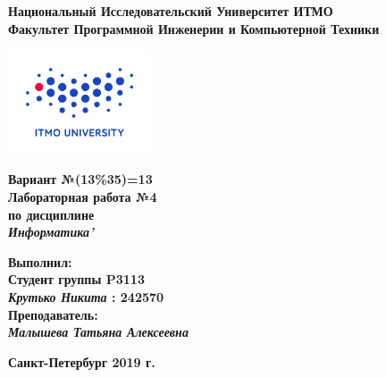 \documentclass[11pt]{article}
\author{Krutko Nikita / KrutNA}
\date{\today}
\title{}
\begin{document}
\large
\thispagestyle{empty}
\begin{center}
\textbf{Национальный Исследовательский Университет ИТМО}\\
\textbf{Факультет Программной Инженерии и Компьютерной Техники}\\
\end{center}
\vspace{2em}
\begin{center}
\includegraphics[width=120pt]{./itmo-logo.png}
\end{center}
\LARGE
\vspace{5em}
\begin{center}
\textbf{Вариант №(13\%35)=13}\\
\textbf{Лабораторная работа №4}\\
\Large
\textbf{по дисциплине}\\
\LARGE
\textbf{\emph{Информатика'}}\\
\end{center}
\vspace{11em}
\large
\begin{flushright}
\textbf{Выполнил:}\\
\textbf{Студент группы P3113}\\
\textbf{\emph{Крутько Никита} : 242570}\\
\textbf{Преподаватель:}\\
\textbf{\emph{Малышева Татьяна Алексеевна}}\\
\end{flushright}
\vspace{4em}
\large
\begin{center}
\textbf{Санкт-Петербург 2019 г.}
\end{center}
\pagebreak{}
\setcounter{tocdepth}{2}
\tableofcontents
\vspace{2em}
\end{document}
